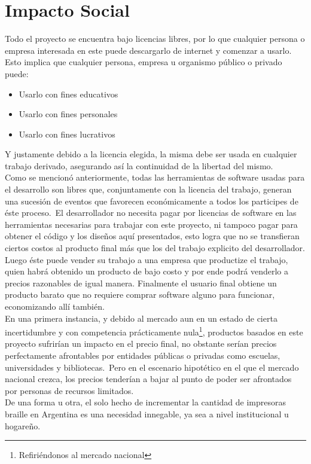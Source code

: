 \chapter{Impacto Social}

Todo el proyecto se encuentra bajo licencias libres, por lo que cualquier
persona o empresa interesada en este puede descargarlo de internet y
comenzar a usarlo. Esto implica que cualquier persona, empresa u organismo
p\'ublico o privado puede:

\begin{itemize}
 \item Usarlo con fines educativos
 \item Usarlo con fines personales
 \item Usarlo con fines lucrativos
\end{itemize}

Y justamente debido a la licencia elegida, la misma debe ser usada en cualquier
trabajo derivado, asegurando as\'i la continuidad de la libertad del mismo.\\

Como se mencion\'o anteriormente, todas las herramientas de software usadas
para el desarrollo son libres que, conjuntamente con la licencia del trabajo,
generan una sucesi\'on de eventos que favorecen econ\'omicamente a todos los
participes de \'este proceso.\
El desarrollador no necesita pagar por licencias de software en las
herramientas necesarias para trabajar con este proyecto, ni tampoco pagar para
obtener el c\'odigo y los dise\~nos aqu\'i presentados, esto logra que no se
transfieran ciertos costos al producto final m\'as que los del trabajo
explicito
del desarrollador. Luego \'este puede vender su trabajo a una empresa que
productize el trabajo, quien habr\'a obtenido un producto de bajo costo y por
ende podr\'a venderlo a precios razonables de igual manera. Finalmente el
usuario final obtiene un producto barato que no requiere comprar software
alguno para funcionar, economizando all\'i tambi\'en.\\

En una primera instancia, y debido al mercado aun en un estado de cierta
incertidumbre y con competencia pr\'acticamente nula\footnote{Refiri\'endonos
al
mercado nacional}, productos basados en este proyecto sufrir\'ian un impacto en
el precio final, no obstante ser\'ian precios perfectamente afrontables por
entidades p\'ublicas o privadas como escuelas, universidades y bibliotecas.\ 
Pero en el escenario hipot\'etico en el que el mercado nacional crezca, los
precios tender\'ian a bajar al punto de poder ser afrontados por personas de
recursos limitados.\\ 

De una forma u otra, el solo hecho de incrementar la cantidad de impresoras
braille en Argentina es una necesidad innegable, ya sea a nivel institucional u
hogare\~no.\\